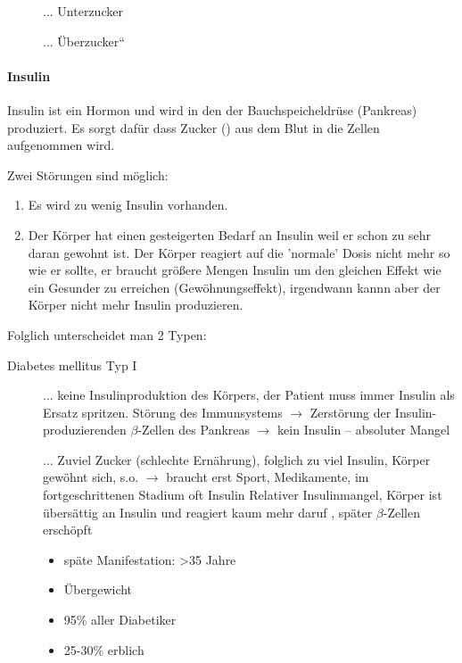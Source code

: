 \begin{description}
\item[] ... Unterzucker

\item[] ... {\quotedblbase}\"Uberzucker{\textquotedblleft}

\end{description}

\paragraph{Insulin}

Insulin ist ein Hormon und wird in den 
der Bauchspeicheldr\"use (Pankreas) produziert. Es sorgt daf\"ur dass
Zucker () aus dem Blut in die Zellen
aufgenommen wird. 

Zwei Störungen sind möglich:

\begin{enumerate}
    \item Es wird zu wenig Insulin vorhanden.
    
    \item Der Körper hat einen gesteigerten Bedarf an Insulin weil er schon 
    zu sehr daran gewohnt ist. Der Körper reagiert auf die 'normale' Dosis
    nicht mehr so wie er sollte, er braucht grö{\ss}ere Mengen Insulin um
    den gleichen Effekt wie ein Gesunder zu erreichen (Gewöhnungseffekt),
    irgendwann kannn aber der Körper nicht mehr Insulin produzieren.
    
\end{enumerate}

Folglich unterscheidet man 2 Typen:

\begin{description}
    \item[Diabetes mellitus Typ I]   ... keine Insulinproduktion des Körpers, der Patient muss
    immer Insulin als Ersatz spritzen.
    Störung des Immunsystems ${\rightarrow}$ Zerstörung der
    Insulin-produzierenden ${\beta}$-Zellen des Pankreas ${\rightarrow}$
    kein Insulin -- absoluter Mangel
    
    \item[]
     ... Zuviel Zucker
    (schlechte Ernährung), folglich zu viel Insulin, Körper gewöhnt
    sich, s.o. ${\rightarrow}$ braucht erst Sport, Medikamente, im
    fort\-ge\-schrittenen Stadium oft Insulin
    Relativer Insulinmangel, Körper ist \"ubersättig an Insulin und
    reagiert kaum mehr daruf ,
    später ${\beta}$-Zellen erschöpft
    
    \begin{itemize}
        \item späte Manifestation: {\textgreater}35 Jahre
        \item \"Ubergewicht
        \item 95\% aller Diabetiker
        \item 25-30\% erblich
    \end{itemize}
    
\end{description}

